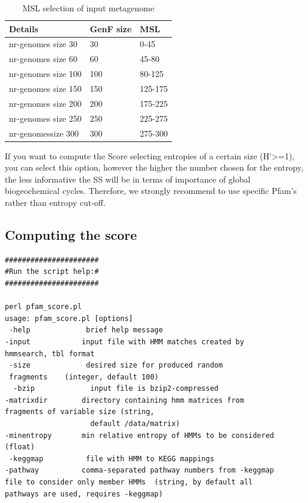 \documentclass[12pt]{report}
\begin{document}
\begin{table}[H]
\centering
\caption{MSL selection of input metagenome}
\label{MSL-input}
\begin{tabular}{@{}lll@{}}
\toprule
Details             & GenF size & MSL     \\ \midrule
nr-genomes size 30  & 30        & 0-45    \\
nr-genomes size 60  & 60        & 45-80   \\
nr-genomes size 100 & 100       & 80-125  \\
nr-genomes size 150 & 150       & 125-175 \\
nr-genomes size 200 & 200       & 175-225 \\
nr-genomes size 250 & 250       & 225-275 \\
nr-genomessize 300  & 300       & 275-300 \\ \bottomrule
\end{tabular}
\end{table}

If you want to compute the Score selecting entropies of a certain 
size (H'>=1), you can select this 
option, however  the higher the number chosen for the entropy,  
the less informative the SS will be in terms of importance of 
global biogeochemical cycles. Therefore, we strongly recommend to 
use specific Pfam's rather than entropy cut-off. 

\subsection{Computing the score}
\label{entropy_score}
\begin{verbatim}
######################
#Run the script help:#
######################

perl pfam_score.pl
usage: pfam_score.pl [options] 
 -help             brief help message
-input            input file with HMM matches created by 
hmmsearch, tbl format
 -size             desired size for produced random 
 fragments    (integer, default 100)
  -bzip             input file is bzip2-compressed
-matrixdir        directory containing hmm matrices from 
fragments of variable size (string, 
                    default /data/matrix)
-minentropy       min relative entropy of HMMs to be considered (float)
 -keggmap          file with HMM to KEGG mappings
-pathway          comma-separated pathway numbers from -keggmap 
file to consider only member HMMs  (string, by default all 
pathways are used, requires -keggmap)
\end{verbatim}
\end{document}
